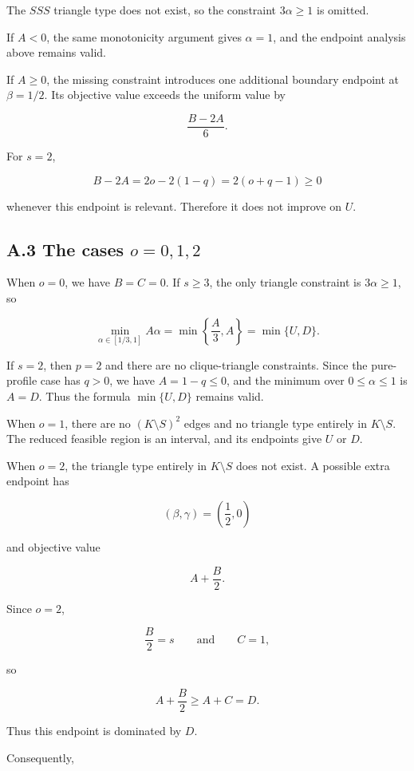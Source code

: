 \documentclass[
  11pt,
]{article}
\begin{document}
The \(SSS\) triangle type does not exist, so the constraint
\(3\alpha\ge1\) is omitted.

If \(A<0\), the same monotonicity argument gives \(\alpha=1\), and the
endpoint analysis above remains valid.

If \(A\ge0\), the missing constraint introduces one additional boundary
endpoint at \(\beta=1/2\). Its objective value exceeds the uniform value
by

\[
\frac{B-2A}{6}.
\]

For \(s=2\),

\[
B-2A
=
2o-2(1-q)
=
2(o+q-1)\ge0
\]

whenever this endpoint is relevant. Therefore it does not improve on
\(U\).

\subsection{\texorpdfstring{A.3 The cases
\(o=0,1,2\)}{A.3 The cases o=0,1,2}}\label{a.3-the-cases-o012}

When \(o=0\), we have \(B=C=0\). If \(s\ge3\), the only triangle
constraint is \(3\alpha\ge1\), so

\[
\min_{\alpha\in[1/3,1]}A\alpha
=
\min\left\{\frac A3,A\right\}
=
\min\{U,D\}.
\]

If \(s=2\), then \(p=2\) and there are no clique-triangle constraints.
Since the pure-profile case has \(q>0\), we have \(A=1-q\le0\), and the
minimum over \(0\le\alpha\le1\) is \(A=D\). Thus the formula
\(\min\{U,D\}\) remains valid.

When \(o=1\), there are no \((K\setminus S)^2\) edges and no triangle
type entirely in \(K\setminus S\). The reduced feasible region is an
interval, and its endpoints give \(U\) or \(D\).

When \(o=2\), the triangle type entirely in \(K\setminus S\) does not
exist. A possible extra endpoint has

\[
(\beta,\gamma)=\left(\frac12,0\right)
\]

and objective value

\[
A+\frac B2.
\]

Since \(o=2\),

\[
\frac B2=s
\qquad\text{and}\qquad
C=1,
\]

so

\[
A+\frac B2\ge A+C=D.
\]

Thus this endpoint is dominated by \(D\).

Consequently,
\end{document}
